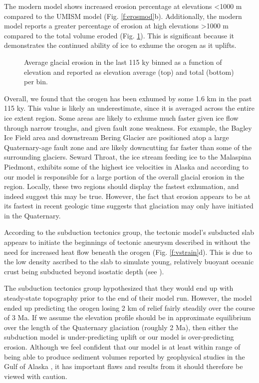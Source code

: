 \documentclass[twocolumn]{aastex6}
\begin{document}
		The modern model shows increased erosion percentage at elevations <1000 m compared to the UMISM model (Fig. \ref{f:erosmod}b). Additionally, the modern model reports a greater percentage of erosion at high elevations >1000 m compared to the total volume eroded (Fig. \ref{f:eroslgmbin}). This is significant because it demonstrates the continued ability of ice to exhume the orogen as it uplifts.

		\begin{figure}[tb]
			\centering
			\caption{\label{f:eroslgmbin}Average glacial erosion in the last 115 ky binned as a function of elevation and reported as elevation average (top) and total (bottom) per bin.}
		\end{figure}

		Overall, we found that the orogen has been exhumed by some 1.6 km in the past 115 ky. This value is likely an underestimate, since it is averaged across the entire ice extent region. Some areas are likely to exhume much faster given ice flow through narrow troughs, and given fault zone weakness. For example, the Bagley Ice Field area and downstream Bering Glacier are positioned atop a large Quaternary-age fault zone and are likely downcutting far faster than some of the surrounding glaciers. Seward Throat, the ice stream feeding ice to the Malaspina Piedmont, exhibits some of the highest ice velocities in Alaska and according to our model is responsible for a large portion of the overall glacial erosion in the region. Locally, these two regions should display the fastest exhumation, and indeed \citet{Berger2008} suggest this may be true. However, the fact that erosion appears to be at its fastest in recent geologic time \citep{Spotila2004} suggests that glaciation may only have initiated in the Quaternary.

		According to the subduction tectonics group, the tectonic model's subducted slab appears to initiate the beginnings of tectonic aneurysm described in \citet{Koons2010,Koons2013} without the need for increased heat flow beneath the orogen (Fig. \ref{f:vstrain}d). This is due to the low density ascribed to the slab to simulate young, relatively buoyant oceanic crust being subducted beyond isostatic depth (see \citealt{Cloos1993}).

		The subduction tectonics group hypothesized that they would end up with steady-state topography prior to the end of their model run. However, the model ended up predicting the orogen losing 2 km of relief fairly steadily over the course of 3 Ma. If we assume the elevation profile should be in approximate equilibrium over the length of the Quaternary glaciation (roughly 2 Ma), then either the subduction model is under-predicting uplift or our model is over-predicting erosion. Although we feel confident that our model is at least within range of being able to produce sediment volumes reported by geophysical studies in the Gulf of Alaska \citep{Sheaf2003,Gulick2007,Boldt2016,Montelli2017}, it has important flaws and results from it should therefore be viewed with caution.
\end{document}
